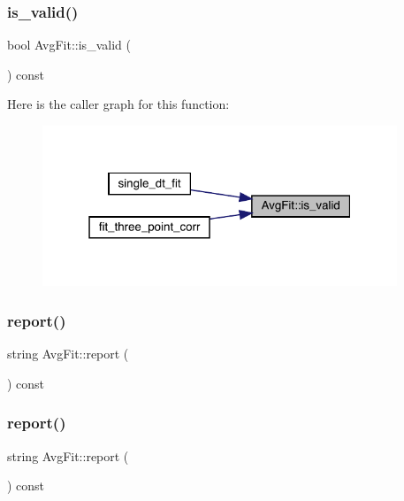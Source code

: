 \subsubsection{\texorpdfstring{is\_valid()}{is\_valid()}\hspace{0.1cm}{\footnotesize\ttfamily [2/2]}}
{\footnotesize\ttfamily bool Avg\+Fit\+::is\+\_\+valid (\begin{DoxyParamCaption}{ }\end{DoxyParamCaption}) const\hspace{0.3cm}{\ttfamily [inline]}}

Here is the caller graph for this function\+:
\nopagebreak
\begin{figure}[H]
\begin{center}
\leavevmode
\includegraphics[width=301pt]{d4/dfd/classAvgFit_a9a906abeb09e724f98fc8b77aff0ea6d_icgraph}
\end{center}
\end{figure}
\mbox{\label{classAvgFit_a78ac6ba410c7f44b543e3b7202e046ca}} 
\subsubsection{\texorpdfstring{report()}{report()}\hspace{0.1cm}{\footnotesize\ttfamily [1/2]}}
{\footnotesize\ttfamily string Avg\+Fit\+::report (\begin{DoxyParamCaption}{ }\end{DoxyParamCaption}) const}

\mbox{\label{classAvgFit_a78ac6ba410c7f44b543e3b7202e046ca}} 
\subsubsection{\texorpdfstring{report()}{report()}\hspace{0.1cm}{\footnotesize\ttfamily [2/2]}}
{\footnotesize\ttfamily string Avg\+Fit\+::report (\begin{DoxyParamCaption}{ }\end{DoxyParamCaption}) const}

